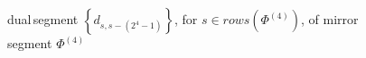 
\begin{figure}[p]

    \noindent{}

    \captionsetup{singlelinecheck=off}
    \caption[\flqq dual\frqq\,segment $\left\lbrace d_{s,s-(2^{4}-1)}\right\rbrace$,
        for $s\in rows\left(\Phi^{(4)}\right)$, in $\mathcal{C}_{\equiv_{2}}^{(5)}$]
        { \flqq dual\frqq\,segment 
                $\left\lbrace d_{s,s-(2^{4}-1)}\right\rbrace$,
                for $s\in rows\left(\Phi^{(4)}\right)$, of \flqq mirror\frqq\,segment 
                $\Phi^{(4)}$ }



    \label{fig:dual-of-mirror-segment}

\end{figure}
